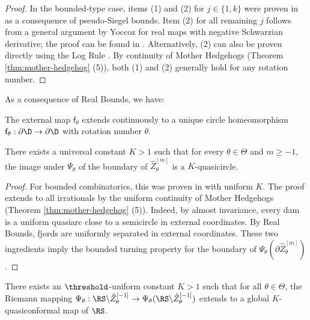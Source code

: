 \documentclass{amsart}
\begin{document}
\begin{proof}
    In the bounded-type case, items (1) and (2) for $j \in \{1,k\}$ were proven in \cite[\S3]{DLi26} as a consequence of pseudo-Siegel bounds.
    Item (2) for all remaining $j$ follows from a general argument by Yoccoz for real maps with negative Schwarzian derivative; the proof can be found in \cite[Appendix B]{dFdM99}.
    Alternatively, (2) can also be proven directly using the Log Rule \cite{DLy22}.
    By continuity of Mother Hedgehogs (Theorem \ref{thm:mother-hedgehog} (5)), both (1) and (2) generally hold for any rotation number.
\end{proof}

As a consequence of Real Bounds, we have:

\begin{corollary}
    The external map $\mathsf{f}_\theta$ extends continuously to a unique circle homeomorphism $\mathsf{f}_{\theta}: \partial \D \to \partial \D$ with rotation number $\theta$. 
\end{corollary}

\begin{lemma}
\label{lem:qc-fjord-external}
    There exists a universal constant $K>1$ such that for every $\theta \in \Theta$ and $m \geq -1$, the image under $\Psi_{\theta}$ of the boundary of $\hat{Z}_{\theta}^{[m]}$ is a $K$-quasicircle.
\end{lemma}

\begin{proof}
    For bounded combinatorics, this was proven in \cite[Lemma 3.2]{DLi26} with uniform $K$. 
    The proof extends to all irrationals by the uniform continuity of Mother Hedgehogs (Theorem \ref{thm:mother-hedgehog} (5)).
    Indeed, by almost invariance, every dam is a uniform quasiarc close to a semicircle in external coordinates. 
    By Real Bounds, fjords are uniformly separated in external coordinates.
    These two ingredients imply the bounded turning property for the boundary of $\Psi_{\theta}(\partial \hat{Z}_{\theta}^{[m]})$.
\end{proof}

\begin{corollary}
\label{cor:qc-external-coords}
    There exists an $\threshold$-uniform constant $K>1$ such that for all $\theta \in \Theta$, 
    the Riemann mapping $\Psi_{\theta}: \RS \backslash \hat{Z}_{\theta}^{[-1]} \to \Psi_{\theta}(\RS \backslash \hat{Z}_{\theta}^{[-1]})$ extends to a global $K$-quasiconformal map of $\RS$. 
\end{corollary}
\end{document}
